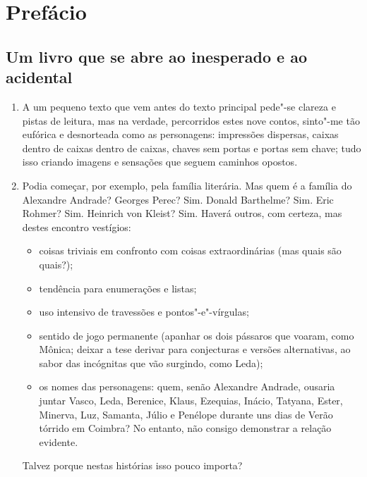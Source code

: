\chapter{Prefácio}

\section{Um livro que se abre ao inesperado e ao acidental}

\begin{enumerate}
\item A um pequeno texto que vem antes do texto principal pede"-se clareza e
pistas de leitura, mas na verdade, percorridos estes nove contos,
sinto"-me tão eufórica e desnorteada como as personagens: impressões
dispersas, caixas dentro de caixas dentro de caixas, chaves sem portas e
portas sem chave; tudo isso criando imagens e sensações que seguem
caminhos opostos.

\item Podia começar, por exemplo, pela família literária. Mas quem é a
família do Alexandre Andrade? Georges Perec? Sim. Donald Barthelme? Sim. Eric Rohmer? Sim.
Heinrich von Kleist? Sim. Haverá outros, com certeza, mas destes encontro vestígios:

\begin{itemize}
\item{} coisas triviais em confronto com coisas extraordinárias (mas quais
são quais?);

\item{} tendência para enumerações e listas;

\item{} uso intensivo de travessões e pontos"-e"-vírgulas;

\item{} sentido de jogo permanente (apanhar os dois pássaros que voaram, como
Mônica; deixar a tese derivar para conjecturas e versões alternativas, ao sabor das incógnitas que vão
surgindo, como Leda);

\item{} os nomes das personagens: quem, senão Alexandre Andrade, ousaria
juntar Vasco, Leda, Berenice, Klaus, Ezequias, Inácio, Tatyana, Ester,
Minerva, Luz, Samanta, Júlio e Penélope durante uns dias de Verão
tórrido em Coimbra? No entanto, não consigo demonstrar a relação
evidente.
\end{itemize}

Talvez porque nestas histórias isso pouco importa?


\end{enumerate}
